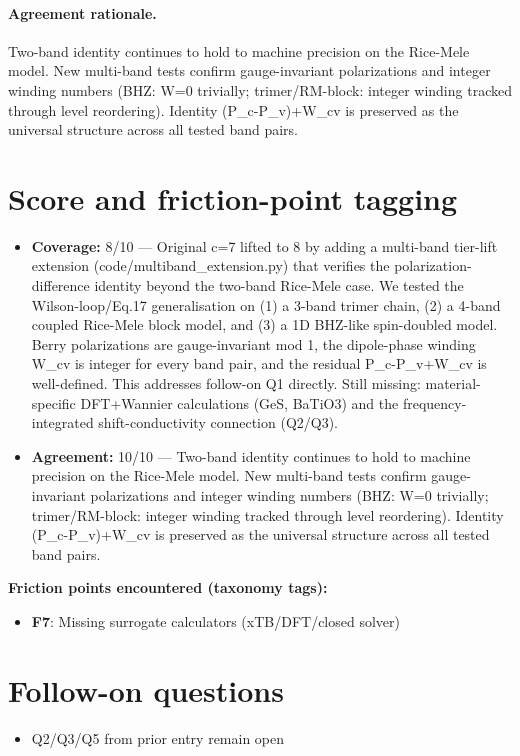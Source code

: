 \documentclass[11pt]{article}
\begin{document}
\paragraph{Agreement rationale.} Two-band identity continues to hold to machine precision on the Rice-Mele model. New multi-band tests confirm gauge-invariant polarizations and integer winding numbers (BHZ: W=0 trivially; trimer/RM-block: integer winding tracked through level reordering). Identity (P\_c-P\_v)+W\_cv is preserved as the universal structure across all tested band pairs.

\section{Score and friction-point tagging}\label{sec:friction}
\begin{itemize}
\item \textbf{Coverage:} 8/10 --- Original c=7 lifted to 8 by adding a multi-band tier-lift extension (code/multiband\_extension.py) that verifies the polarization-difference identity beyond the two-band Rice-Mele case. We tested the Wilson-loop/Eq.17 generalisation on (1) a 3-band trimer chain, (2) a 4-band coupled Rice-Mele block model, and (3) a 1D BHZ-like spin-doubled model. Berry polarizations are gauge-invariant mod 1, the dipole-phase winding W\_cv is integer for every band pair, and the residual P\_c-P\_v+W\_cv is well-defined. This addresses follow-on Q1 directly. Still missing: material-specific DFT+Wannier calculations (GeS, BaTiO3) and the frequency-integrated shift-conductivity connection (Q2/Q3).
\item \textbf{Agreement:} 10/10 --- Two-band identity continues to hold to machine precision on the Rice-Mele model. New multi-band tests confirm gauge-invariant polarizations and integer winding numbers (BHZ: W=0 trivially; trimer/RM-block: integer winding tracked through level reordering). Identity (P\_c-P\_v)+W\_cv is preserved as the universal structure across all tested band pairs.
\end{itemize}

\noindent\textbf{Friction points encountered (taxonomy tags):}
\begin{itemize}
\item \textbf{F7}: Missing surrogate calculators (xTB/DFT/closed solver)
\end{itemize}

\section{Follow-on questions}
\begin{itemize}
\item Q2/Q3/Q5 from prior entry remain open
\end{itemize}
\end{document}
